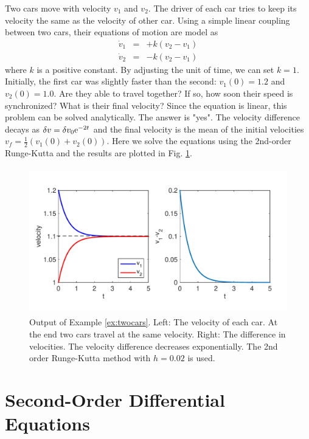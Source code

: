 \begin{example}\label{ex:twocars}
Two cars  move with velocity $v_1$ and $v_2$.  The driver of each car tries to keep its velocity the same as the velocity of other car. Using a simple linear coupling between two cars, their equations of motion are model as
\begin{eqnarray}
\dot{v}_1 &=& + k (v_2-v_1) \nonumber \\
\dot{v}_2 &=& - k (v_2-v_1)
\end{eqnarray}
where $k$ is a positive constant.  By adjusting the unit of time, we can set $k=1$.  Initially, the first car was slightly faster than the second: $v_1(0) = 1.2$ and $v_2(0) = 1.0$.  Are they able to travel together? If so, how soon their speed is synchronized?  What is their final velocity?  Since the equation is linear, this problem can be solved analytically.  The answer is "yes".  The velocity difference decays as $\delta v = \delta v_0 \text{e}^{-2t}$ and the final velocity is the mean of the initial velocities $v_f = \frac{1}{2} (v_1(0)+v_2(0))$.  Here we solve the equations using the 2nd-order Runge-Kutta and the results are plotted in Fig. \ref{fig:twocars}.

\begin{figure}
\centerline{\includegraphics[height=2.5in]{05.ode1/twocars.pdf}}
\caption{Output of Example \ref{ex:twocars}.  Left: The velocity of each car. At the end two cars travel at the same velocity. Right: The difference in velocities.  The velocity difference decreases exponentially. The 2nd order Runge-Kutta method with $h=0.02$ is used.}
\label{fig:twocars}
\end{figure}
\end{example}



\section{Second-Order Differential Equations}

